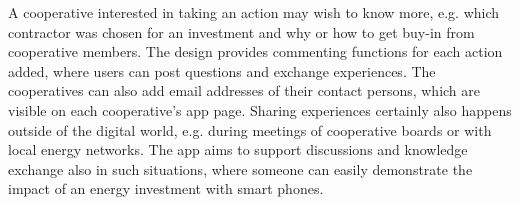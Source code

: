 A cooperative interested in taking an action may wish to know more, e.g. which contractor was chosen for an investment and why or how to get buy-in from cooperative members. The design provides commenting functions for each action added, where users can post questions and exchange experiences. The cooperatives can also add email addresses of their contact persons, which are visible on each cooperative's app page.
% 
Sharing experiences certainly also happens outside of the digital world, e.g. during meetings of cooperative boards or with local energy networks. The app aims  to support discussions and knowledge exchange also in such situations, where someone can easily demonstrate the impact of an energy investment with smart phones.

%

